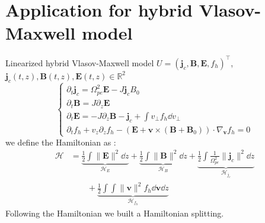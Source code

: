 \documentclass{beamer}
\newcommand{\Mvb}[1]{\boldsymbol{#1}}
\begin{document}
\section{Application for hybrid Vlasov-Maxwell model}
\begin{frame}{Linearized hybrid Vlasov-Maxwell model}
  $U = \left(\Mvb{j}_c , \Mvb{B} , \Mvb{E} , f_h \right)^\top$, $\Mvb{j}_c(t,z),\Mvb{B}(t,z),\Mvb{E}(t,z)\in\mathbb{R}^2$
  $$
    \begin{cases}
      \partial_t\Mvb{j}_c = \Omega_{pe}^2\Mvb{E} - J\Mvb{j}_c B_0 \\
      \partial_t\Mvb{B}   = J\partial_z\Mvb{E} \\
      \partial_t\Mvb{E}   = -J\partial_z\Mvb{B} - \Mvb{j}_c + \int v_\perp f_h\dd{v_\perp} \\
      \partial_t f_h  + v_z\partial_z f_h - \left( \Mvb{E} + \Mvb{v}\times(\Mvb{B}+\Mvb{B}_0) \right)\cdot\nabla_{\Mvb{v}} f_h = 0
    \end{cases}
  $$
  we define the Hamiltonian as :
  $$
    \begin{aligned}
      \mathcal{H} &=
        \underbrace{\frac{1}{2}\int \|\Mvb{E}\|^2 \dd{z}}_{\mathcal{H}_E}
      + \underbrace{\frac{1}{2}\int \|\Mvb{B}\|^2 \dd{z}}_{\mathcal{H}_B}
      + \underbrace{\frac{1}{2}\int \frac{1}{\Omega_{pe}^2}\|\Mvb{j}_c\|^2 \dd{z}}_{\mathcal{H}_{j_c}}\\
      &\qquad+ \underbrace{\frac{1}{2}\int\int \|\Mvb{v}\|^2f_h \dd{\Mvb{v}}\dd{z}}_{\mathcal{H}_{f_h}}
    \end{aligned}
  $$
  Following the Hamiltonian we built a Hamiltonian splitting.
\end{frame}
\end{document}
